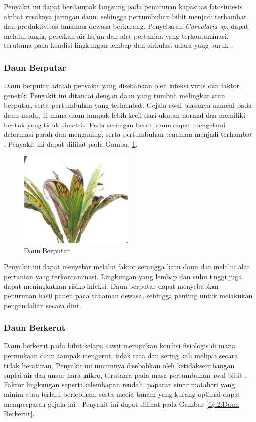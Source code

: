 Penyakit ini dapat berdampak langsung pada penurunan kapasitas fotosintesis akibat rusaknya jaringan daun, sehingga pertumbuhan bibit menjadi terhambat dan produktivitas tanaman dewasa berkurang. Penyebaran \textit{Curvularia sp.} dapat melalui angin, percikan air hujan dan alat pertanian yang terkontaminasi, terutama pada kondisi lingkungan lembap dan sirkulasi udara yang buruk \cite{agustina2019rapid}.

\subsubsection{Daun Berputar} \label{II.Daun Berputar}
Daun berputar adalah penyakit yang disebabkan oleh infeksi virus dan faktor genetik. Penyakit ini ditandai dengan daun yang tumbuh melingkar atau berputar, serta pertumbuhan yang terhambat. Gejala awal biasanya muncul pada daun muda, di mana daun tampak lebih kecil dari ukuran normal dan memiliki bentuk yang tidak simetris. Pada serangan berat, daun dapat mengalami deformasi parah dan menguning, serta pertumbuhan tanaman menjadi terhambat \cite{afriliya2019keanekaragaman}\cite{suhesti2022analisis}. Penyakit ini dapat dilihat pada Gambar \ref{fig:2.Daun Berputar}.

\begin{figure}[H]
	\centering
	\includegraphics[width=0.5\textwidth]{figure/chapter-2-daun-berputar.jpg}
	\caption{Daun Berputar}
	\label{fig:2.Daun Berputar}
\end{figure}

Penyakit ini dapat menyebar melalui faktor serangga kutu daun dan melalui alat pertanian yang terkontaminasi. Lingkungan yang lembap dan suhu tinggi juga dapat meningkatkan risiko infeksi. Daun berputar dapat menyebabkan penurunan hasil panen pada tanaman dewasa, sehingga penting untuk melakukan pengendalian secara dini \cite{malado2024pengendalian}.

\subsubsection{Daun Berkerut} \label{II.Daun Berkerut}
Daun berkerut pada bibit kelapa sawit merupakan kondisi fisiologis di mana permukaan daun tampak mengerut, tidak rata dan sering kali melipat secara tidak beraturan. Penyakit ini umumnya disebabkan oleh ketidakseimbangan suplai air dan unsur hara mikro, terutama pada masa pertumbuhan awal bibit \cite{rahayu2023penyakit}\cite{suhesti2022analisis}. Faktor lingkungan seperti kelembapan rendah, paparan sinar matahari yang minim atau terlalu berlebihan, serta media tanam yang kurang optimal dapat memperparah gejala ini \cite{syahfari2024buku}. Penyakit ini dapat dilihat pada Gambar \ref{fig:2.Daun Berkerut}.

